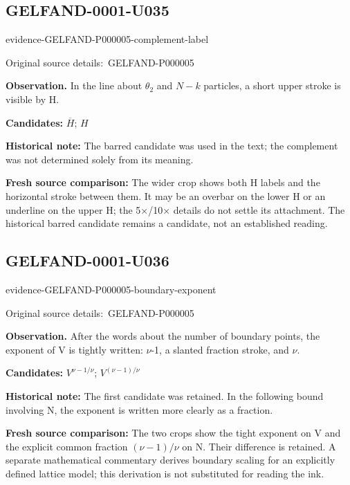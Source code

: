 \documentclass[11pt]{article}
\newcommand{\EvidenceBlock}[4]{%
 \par\smallskip\noindent\begin{minipage}{\linewidth}
 \begin{minipage}[t]{.47\linewidth}\vspace{0pt}\centering
 \csname evidence-#1-#2\endcsname\par
 {\scriptsize\SourceCropCaption\ #1}\par
 \end{minipage}\hfill
 \begin{minipage}[t]{.49\linewidth}\vspace{0pt}\raggedright
 {\small\color{orange!65!black}\textbf{#4} #3}\par
 \end{minipage}
 \end{minipage}\par\smallskip}
\newcommand{\SourceCropCaption}{Original source details:}\newcommand{\ReadingCaption}{Uncertain reading.}\newcommand{\IncompleteCaption}{Undeciphered passage.}\newcommand{\DiagramCaption}{Diagram and typed description.}
\begin{document}
\subsection*{GELFAND-0001-U035}
\EvidenceBlock{GELFAND-P000005}{complement-label}{In the line about \(\theta_2\) and \(N-k\) particles, a short upper stroke is visible by H.}{Observation.}
\par\smallskip\noindent\textbf{Candidates: } \(\overline H\); \(H\)\par
\par\smallskip\noindent\textbf{Historical note: } The barred candidate was used in the text; the complement was not determined solely from its meaning.\par
\par\smallskip\noindent\textbf{Fresh source comparison: } The wider crop shows both H labels and the horizontal stroke between them. It may be an overbar on the lower H or an underline on the upper H; the 5×/10× details do not settle its attachment. The historical barred candidate remains a candidate, not an established reading.\par

\subsection*{GELFAND-0001-U036}
\EvidenceBlock{GELFAND-P000005}{boundary-exponent}{After the words about the number of boundary points, the exponent of V is tightly written: \(\nu\)-1, a slanted fraction stroke, and \(\nu\).}{Observation.}
\par\smallskip\noindent\textbf{Candidates: } \(V^{\nu-1/\nu}\); \(V^{(\nu-1)/\nu}\)\par
\par\smallskip\noindent\textbf{Historical note: } The first candidate was retained. In the following bound involving N, the exponent is written more clearly as a fraction.\par
\par\smallskip\noindent\textbf{Fresh source comparison: } The two crops show the tight exponent on V and the explicit common fraction \((\nu-1)/\nu\) on N. Their difference is retained. A separate mathematical commentary derives boundary scaling for an explicitly defined lattice model; this derivation is not substituted for reading the ink.\par
\end{document}

